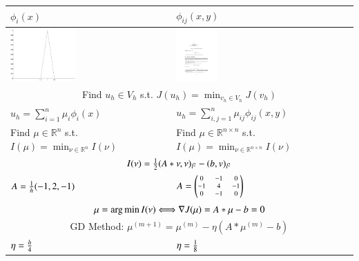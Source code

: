 \begin{table}[]
\begin{tabular}{ p{7cm}<{\centering}|p{7cm}<{\centering}}
\\\hline
 $\phi_i(x)$   & $\phi_{ij}(x, y)$ 
 \\\hline
 \begin{minipage}{0.4\textwidth}\centering
      	\includegraphics[height=2cm]{figures/basisfunction.pdf}
   	 \end{minipage}
    & \begin{minipage}{0.5\textwidth}\centering
      	\includegraphics[height=2cm]{figures/nodalbasis.pdf}
   	 \end{minipage} 
\\\hline
 \multicolumn{2}{c}{Find $u_h\in V_h$ s.t. $\displaystyle J(u_h)=\min_{v_h\in V_h} J(v_h)$}    
 \\\hline
 $\displaystyle u_h=\sum_{i=1}^n \mu_i\phi_i(x)$         &    $\displaystyle u_h=\sum_{i, j=1}^n \mu_{ij}\phi_{ij}(x, y)$      
  \\\hline
 Find $\mu\in \mathbb{R}^n$ s.t. $\displaystyle  I(\mu)=\min_{\nu\in \mathbb{R}^n} I(\nu)$
 &   Find $\mu\in \mathbb{R}^{n\times n}$ s.t. $\displaystyle  I(\mu)=\min_{\nu\in \mathbb{R}^{n\times n}} I(\nu)$  
 \\\hline
 \multicolumn{2}{c}{$I(\nu)={1\over 2}(A\ast \nu, \nu)_{l^2} - (b, v)_{l^2} $}  
 \\\hline
 $A={1\over h}(-1, 2, -1)$        &   
$\scriptsize
 A=\begin{pmatrix}
 0&-1&0\\
 -1&4&-1\\
 0&-1&0
 \end{pmatrix}
$     
 \\\hline
  \multicolumn{2}{c}{$\mu=\operatorname*{arg\,min} I(\nu) \Longleftrightarrow \nabla J(\mu)=A\ast \mu -b=0$}    \\\hline
\multicolumn{2}{c}{ GD Method:   $ \mu^{(m+1)}=\mu^{(m)} -\eta(A\ast \mu^{(m)}-b)$}       
 \\\hline
$\eta={h\over 4}$       &    $\eta={1\over 8}$      \\\hline
\end{tabular}
\end{table}

